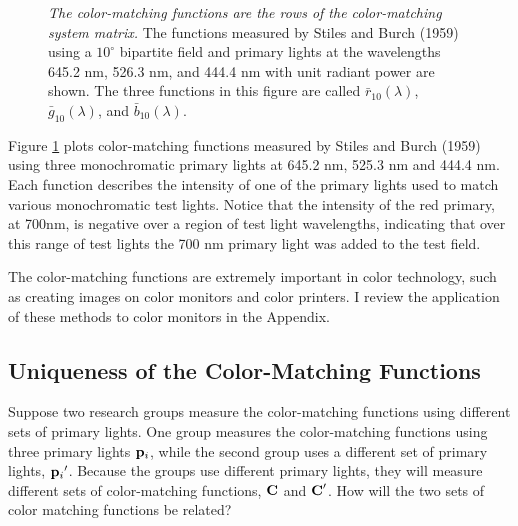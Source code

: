 \begin{figure}
\centerline {
}
\label{f3:cie.rgb}
\caption[Stiles and Burch 10 Deg Color Matching Functions]{
{\em The color-matching functions are the rows
of the color-matching system matrix.}
The functions measured by Stiles and Burch (1959) using
a $10^\circ$ bipartite field
and primary lights at the wavelengths 
645.2 nm, 526.3 nm, and 444.4 nm
with unit radiant power are shown.
The three functions in this figure are called
$\bar{r}_{10}(\lambda)$,
$\bar{g}_{10}(\lambda)$, and
$\bar{b}_{10}(\lambda)$.
}
\end{figure}
Figure \ref{f3:cie.rgb} plots color-matching functions
measured by Stiles and Burch (1959)
using three monochromatic primary lights at
645.2 nm, 525.3 nm and 444.4 nm.
Each function describes the intensity of one of the primary
lights used to match various monochromatic test lights.
Notice that the intensity of the red primary, at 700nm, 
is negative over a region of test light wavelengths,
indicating that over this range of test lights
the 700 nm primary light was added to the test field.

The color-matching functions are extremely important
in color technology, such as creating images on
color monitors and color printers.
I review the application of these methods to
color monitors in the Appendix.

\subsection*{Uniqueness of the Color-Matching Functions}

Suppose two research groups measure the color-matching functions
using different sets of primary lights.
One group measures the color-matching functions using
three primary lights $\mbox{${\bf p}_{i}$}$, while
the second group uses a different set of primary lights, $\mbox{${\bf p}_{i}$}'$.
Because the groups use different primary lights,
they will measure different sets of
color-matching functions, $\mbox{\bf C}$ and $\mbox{\bf C} '$.
How will the two sets of color matching functions be related?

